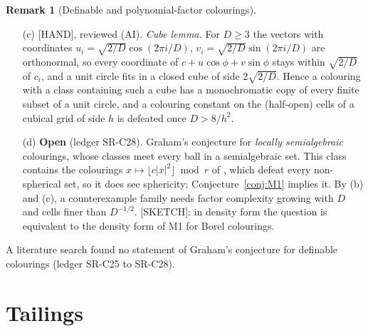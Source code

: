 \documentclass[11pt]{amsart}
\newcommand{\st}[1]{\textsf{[#1]}}
\newcommand{\R}{\mathbb{R}}
\theoremstyle{plain}
\theoremstyle{definition}
\newtheorem{remark}[theorem]{Remark}
\begin{document}
\begin{remark}[Definable and polynomial-factor colourings]
\begin{enumerate}
Theorem~5 (an odd polynomial map to $\R^m$ vanishes on such a subspace) \cite{DolnikovKarasev} to the
homogeneous components one at a time, inside a decreasing chain of subspaces; both conclusions pass to
subspaces. The cited theorems are read at the level of their statements; $N$ is not effective. The same
holds, with a bound $N(d,s,m,k)$, for $m$ bracket-polynomial expressions built with at most $s$ gates
$+,\times,\lfloor\cdot\rfloor$ over polynomial leaves of degree $\le d$, by induction on the floor depth; it
does not cover families whose number of brackets grows with $D$. The ingredients are Dol'nikov and
Karasev's \cite{DolnikovKarasev}; Bukh and Karasev \cite[\S2]{BukhKarasev} already link
Dvoretzky- and Knaster-type theorems to Euclidean Ramsey problems, and Gromov's ``Hilbert
symmetrization'' and ``Ramsey--Dvoretzky'' discussion \cite[\S1.12]{Gromov} is prior art for this
radialisation idea. Our contribution is only the observation that it disposes of this class of
candidate colourings.
\item[(c)] \st{HAND}, reviewed (AI). \emph{Cube lemma.} For $D\ge3$ the vectors with coordinates
$u_i=\sqrt{2/D}\cos(2\pi i/D)$, $v_i=\sqrt{2/D}\sin(2\pi i/D)$ are orthonormal, so every coordinate of
$c+u\cos\phi+v\sin\phi$ stays within $\sqrt{2/D}$ of $c_i$, and a unit circle fits in a closed cube of side
$2\sqrt{2/D}$. Hence a colouring with a class containing such a cube has a monochromatic copy of every finite
subset of a unit circle, and a colouring constant on the (half-open) cells of a cubical grid of side $h$ is
defeated once $D>8/h^2$.
\item[(d)] \textbf{Open} (ledger SR-C28). Graham's conjecture for \emph{locally semialgebraic} colourings,
whose classes meet every ball in a semialgebraic set. This class contains the colourings
$x\mapsto\lfloor c|x|^2\rfloor\bmod r$ of \cite{EGMRSS}, which defeat every non-spherical set, so it does see
sphericity; Conjecture~\ref{conj:M1} implies it. By (b) and (c), a counterexample family needs factor
complexity growing with $D$ and cells finer than $D^{-1/2}$. \st{SKETCH}: in density form the question is
equivalent to the density form of M1 for Borel colourings.
\end{enumerate}
A literature search found no statement of Graham's conjecture for definable colourings
(ledger SR-C25 to SR-C28).
\end{remark}

\section{Tailings}\label{sec:tailings}
\end{document}
